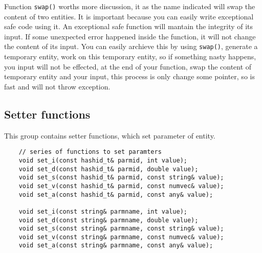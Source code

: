\documentclass[letterpaper]{book}
\begin{document}
Function \lstinline$swap()$ worths more discussion, it as the name indicated will swap 
the content of two entities. It is important because you can easily write exceptional 
safe code using it. An exceptional safe function will mantain the integrity of its input.
If some unexpected error happened inside the function, it will not change the content of
its input. You can easily archieve this by using \lstinline$swap()$, generate a temporary
entity, work on this temporary entity, so if something nasty happens, you input will not
be effected, at the end of your function, swap the content of temporary entity and your 
input, this process is only change some pointer, so is fast and will not throw exception.

\subsection{Setter functions}
This group contains setter functions, which set parameter of entity.

\begin{lstlisting}        
    // series of functions to set paramters         
    void set_i(const hashid_t& parmid, int value);
    void set_d(const hashid_t& parmid, double value); 
    void set_s(const hashid_t& parmid, const string& value);
    void set_v(const hashid_t& parmid, const numvec& value); 
    void set_a(const hashid_t& parmid, const any& value); 

    void set_i(const string& parmname, int value); 
    void set_d(const string& parmname, double value); 
    void set_s(const string& parmname, const string& value); 
    void set_v(const string& parmname, const numvec& value); 
    void set_a(const string& parmname, const any& value); 

\end{lstlisting}
\end{document}

